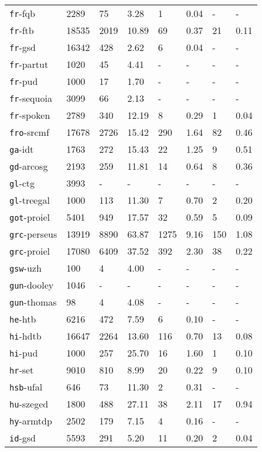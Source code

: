 \begin{longtable}{|l|l|l|l|l|l|l|l|}
\texttt{fr}-fqb & 2289 & 75 & 3.28 & 1 & 0.04 & - & -\\
\texttt{fr}-ftb & 18535 & 2019 & 10.89 & 69 & 0.37 & 21 & 0.11\\
\texttt{fr}-gsd & 16342 & 428 & 2.62 & 6 & 0.04 & - & -\\
\texttt{fr}-partut & 1020 & 45 & 4.41 & - & - & - & -\\
\texttt{fr}-pud & 1000 & 17 & 1.70 & - & - & - & -\\
\texttt{fr}-sequoia & 3099 & 66 & 2.13 & - & - & - & -\\
\texttt{fr}-spoken & 2789 & 340 & 12.19 & 8 & 0.29 & 1 & 0.04\\
\texttt{fro}-srcmf & 17678 & 2726 & 15.42 & 290 & 1.64 & 82 & 0.46\\
\texttt{ga}-idt & 1763 & 272 & 15.43 & 22 & 1.25 & 9 & 0.51\\
\texttt{gd}-arcosg & 2193 & 259 & 11.81 & 14 & 0.64 & 8 & 0.36\\
\texttt{gl}-ctg & 3993 & - & - & - & - & - & -\\
\texttt{gl}-treegal & 1000 & 113 & 11.30 & 7 & 0.70 & 2 & 0.20\\
\texttt{got}-proiel & 5401 & 949 & 17.57 & 32 & 0.59 & 5 & 0.09\\
\texttt{grc}-perseus & 13919 & 8890 & 63.87 & 1275 & 9.16 & 150 & 1.08\\
\texttt{grc}-proiel & 17080 & 6409 & 37.52 & 392 & 2.30 & 38 & 0.22\\
\texttt{gsw}-uzh & 100 & 4 & 4.00 & - & - & - & -\\
\texttt{gun}-dooley & 1046 & - & - & - & - & - & -\\
\texttt{gun}-thomas & 98 & 4 & 4.08 & - & - & - & -\\
\texttt{he}-htb & 6216 & 472 & 7.59 & 6 & 0.10 & - & -\\
\texttt{hi}-hdtb & 16647 & 2264 & 13.60 & 116 & 0.70 & 13 & 0.08\\
\texttt{hi}-pud & 1000 & 257 & 25.70 & 16 & 1.60 & 1 & 0.10\\
\texttt{hr}-set & 9010 & 810 & 8.99 & 20 & 0.22 & 9 & 0.10\\
\texttt{hsb}-ufal & 646 & 73 & 11.30 & 2 & 0.31 & - & -\\
\texttt{hu}-szeged & 1800 & 488 & 27.11 & 38 & 2.11 & 17 & 0.94\\
\texttt{hy}-armtdp & 2502 & 179 & 7.15 & 4 & 0.16 & - & -\\
\texttt{id}-gsd & 5593 & 291 & 5.20 & 11 & 0.20 & 2 & 0.04\\

\end{longtable}
